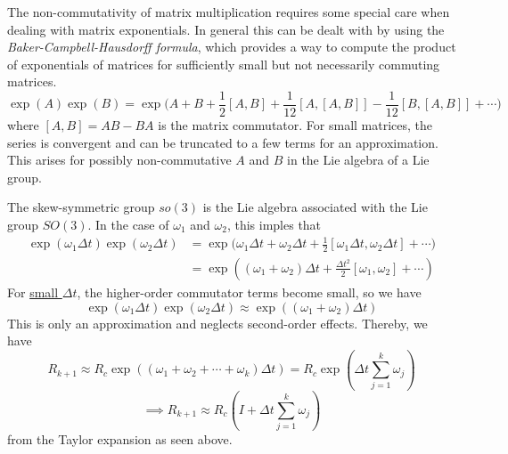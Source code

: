 \vspace*{2em}
The non-commutativity of matrix multiplication requires some special care when dealing with matrix exponentials.
In general this can be dealt with by using the \textit{Baker-Campbell-Hausdorff formula}, which provides a way to compute the product of exponentials of matrices for sufficiently small but not necessarily commuting matrices.
\begin{equation*}
    \exp(A) \exp(B)
    =
    \exp\Big(A+B+\frac{1}{2}[A,B]+\frac{1}{12}[A,[A,B]]-\frac{1}{12}[B,[A,B]]+\cdots\Big)
\end{equation*}
where \( [A,B] = AB - BA \) is the matrix commutator.
For small matrices, the series is convergent and can be truncated to a few terms for an approximation.
This arises for possibly non-commutative \( A \) and \( B \) in the Lie algebra of a Lie group.

The skew-symmetric group \(so(3)\) is the Lie algebra associated with the Lie group \( SO(3) \).
In the case of \( \omega_1 \) and \( \omega_2 \), this imples that
\begin{align*}
    \exp(\omega_1 \Delta t) \exp(\omega_2 \Delta t)
     & =
    \exp\Big(\omega_1 \Delta t + \omega_2 \Delta t + \frac{1}{2}[\omega_1 \Delta t, \omega_2 \Delta t] + \cdots\Big)
    \\ & =
    \exp \left( (\omega_1 + \omega_2) \Delta t + \frac{\Delta t^2}{2}[\omega_1, \omega_2] + \cdots \right)
\end{align*}
For \underline{small \(\Delta t\)}, the higher-order commutator terms become small, so we have
\[
    \exp(\omega_1 \Delta t) \exp(\omega_2 \Delta t) \approx \exp((\omega_1 + \omega_2) \Delta t)
\]
This is only an approximation and neglects second-order effects.
Thereby, we have
\begin{equation*}
    R_{k+1}
    \approx
    R_c \exp((\omega_1 + \omega_2 + \cdots + \omega_k) \Delta t)
    =
    R_c \exp\left(\Delta t \sum_{j=1}^{k} \omega_j\right)
\end{equation*}
\begin{equation*}
    \implies
    \boxed{
        R_{k+1}
        \approx
        R_c \left( I + \Delta t \sum_{j=1}^{k} \omega_j \right)
    }
\end{equation*}
from the Taylor expansion as seen above.
